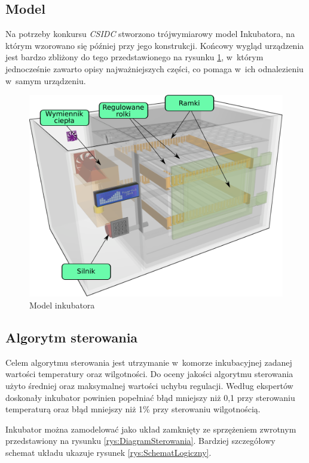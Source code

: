 \subsection{Model}
Na potrzeby konkursu \emph{CSIDC} stworzono trójwymiarowy model Inkubatora, na
którym wzorowano się później przy jego konstrukcji. Końcowy wygląd urządzenia jest
bardzo zbliżony do tego przedstawionego na rysunku \ref{rys:InkubatorModel},
w~którym jednocześnie zawarto opisy najważniejszych części, co pomaga w~ich
odnalezieniu w~samym urządzeniu.

\begin{figure}[t] 
	\centering\includegraphics[width=\textwidth]{figures/Incubator}
	\caption{Model inkubatora}\label{rys:InkubatorModel}
\end{figure}

\subsection{Algorytm sterowania}
Celem algorytmu sterowania jest utrzymanie w~komorze inkubacyjnej zadanej
wartości temperatury oraz wilgotności. Do oceny jakości algorytmu sterowania
użyto średniej oraz maksymalnej wartości uchybu regulacji. Według ekspertów doskonały
inkubator powinien popełniać błąd mniejszy niż 0,1\st{} przy sterowaniu
temperaturą oraz błąd mniejszy niż 1\% przy sterowaniu wilgotnością.

Inkubator można zamodelować jako układ zamknięty ze sprzężeniem zwrotnym
\cite{Brzozka04} \cite{Bubnicki}
przedstawiony na rysunku \ref{rys:DiagramSterowania}. Bardziej szczegółowy
schemat układu ukazuje rysunek \ref{rys:SchematLogiczny}.

